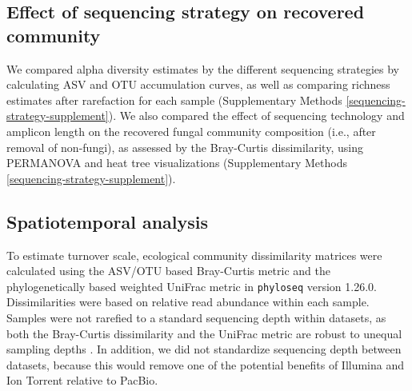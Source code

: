\documentclass[
  12pt,
]{article}
\begin{document}
\hypertarget{effect-of-sequencing-strategy-on-recovered-community}{%
\subsection{Effect of sequencing strategy on recovered community}\label{effect-of-sequencing-strategy-on-recovered-community}}

We compared alpha diversity estimates by the different sequencing strategies by calculating ASV and OTU accumulation curves, as well as comparing richness estimates after rarefaction for each sample (Supplementary Methods \ref{sequencing-strategy-supplement}).
We also compared the effect of sequencing technology and amplicon length on the recovered fungal community composition (i.e., after removal of non-fungi), as assessed by the Bray-Curtis dissimilarity, using PERMANOVA and heat tree visualizations (Supplementary Methods \ref{sequencing-strategy-supplement}).

\hypertarget{spatiotemporal-analysis}{%
\subsection{Spatiotemporal analysis}\label{spatiotemporal-analysis}}

To estimate turnover scale, ecological community dissimilarity matrices were calculated using the ASV/OTU based Bray-Curtis metric \autocite[for both long and short amplicons]{bray1957} and the phylogenetically based weighted UniFrac metric \autocites[for only long amplicons]{lozupone2005,lozupone2007} in \texttt{phyloseq} version 1.26.0.
Dissimilarities were based on relative read abundance within each sample.
Samples were not rarefied to a standard sequencing depth within datasets, as both the Bray-Curtis dissimilarity and the UniFrac metric are robust to unequal sampling depths \autocite{mcmurdie2014}.
In addition, we did not standardize sequencing depth between datasets, because this would remove one of the potential benefits of Illumina and Ion Torrent relative to PacBio.
\end{document}
